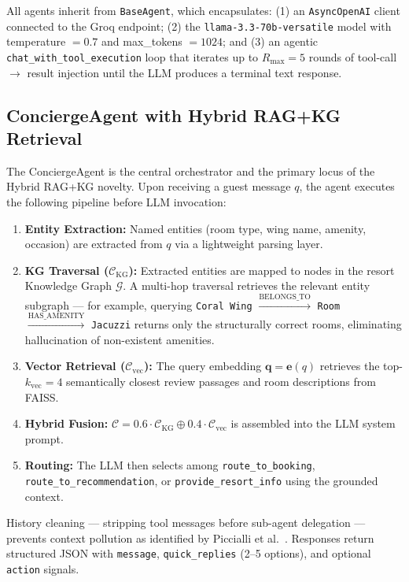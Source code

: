\documentclass[11pt,a4paper]{report}
\begin{document}
All agents inherit from \texttt{BaseAgent}, which encapsulates: (1) an \texttt{AsyncOpenAI} client connected to the Groq endpoint; (2) the \texttt{llama-3.3-70b-versatile} model with temperature $= 0.7$ and max\_tokens $= 1024$; and (3) an agentic \texttt{chat\_with\_tool\_execution} loop that iterates up to $R_{\max} = 5$ rounds of tool-call $\rightarrow$ result injection until the LLM produces a terminal text response.

\subsection{ConciergeAgent with Hybrid RAG+KG Retrieval}

The ConciergeAgent is the central orchestrator and the primary locus of the Hybrid RAG+KG novelty. Upon receiving a guest message $q$, the agent executes the following pipeline before LLM invocation:

\begin{enumerate}[leftmargin=1.5cm]
    \item \textbf{Entity Extraction:} Named entities (room type, wing name, amenity, occasion) are extracted from $q$ via a lightweight parsing layer.
    \item \textbf{KG Traversal ($\mathcal{C}_{\text{KG}}$):} Extracted entities are mapped to nodes in the resort Knowledge Graph $\mathcal{G}$. A multi-hop traversal retrieves the relevant entity subgraph — for example, querying \texttt{Coral Wing} $\xrightarrow{\text{BELONGS\_TO}}$ \texttt{Room} $\xrightarrow{\text{HAS\_AMENITY}}$ \texttt{Jacuzzi} returns only the structurally correct rooms, eliminating hallucination of non-existent amenities.
    \item \textbf{Vector Retrieval ($\mathcal{C}_{\text{vec}}$):} The query embedding $\mathbf{q} = \mathbf{e}(q)$ retrieves the top-$k_{\text{vec}} = 4$ semantically closest review passages and room descriptions from FAISS.
    \item \textbf{Hybrid Fusion:} $\mathcal{C} = 0.6 \cdot \mathcal{C}_{\text{KG}} \oplus 0.4 \cdot \mathcal{C}_{\text{vec}}$ is assembled into the LLM system prompt.
    \item \textbf{Routing:} The LLM then selects among \texttt{route\_to\_booking}, \texttt{route\_to\_recommendation}, or \texttt{provide\_resort\_info} using the grounded context.
\end{enumerate}

History cleaning — stripping tool messages before sub-agent delegation — prevents context pollution as identified by Piccialli et al.~\cite{piccialli2025agentai}. Responses return structured JSON with \texttt{message}, \texttt{quick\_replies} (2–5 options), and optional \texttt{action} signals.
\end{document}
